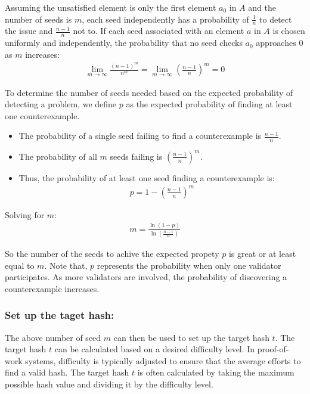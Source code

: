 \documentclass[runningheads]{llncs}
\begin{document}
Assuming the unsatisfied element is only the first element \( a_0 \) in \( A \) and the number of seeds is \( m \), each seed independently has a probability of \( \frac{1}{n} \) to detect the issue and \( \frac{n-1}{n} \) not to. If each seed associated with an element \( a \) in \( A \) is chosen uniformly and independently, the probability that no seed checks \( a_0 \) approaches 0 as \( m \) increases:
\begin{gather*}
\lim_{m \to \infty} \frac{(n-1)^m}{n^m} = \lim_{m \to \infty} \left( \frac{n-1}{n} \right)^m = 0
\end{gather*}

To determine the number of seeds needed based on the expected probability of detecting a problem, we define \( p \) as the expected probability of finding at least one counterexample. 
\begin{itemize}
    \item The probability of a single seed failing to find a counterexample is \( \frac{n-1}{n} \).
    \item The probability of all \( m \) seeds failing is \( \left( \frac{n-1}{n} \right)^m \).
    \item Thus, the probability of at least one seed finding a counterexample is:
\begin{gather*}
  p = 1 - \left( \frac{n-1}{n} \right)^m
\end{gather*}
\end{itemize}
Solving for \( m \):
\begin{gather}
\label{eq:12}
m = \frac{\ln(1 - p)}{\ln\left( \frac{n-1}{n} \right)}
\end{gather}

So the number of the seeds to achive the expected propety $p$ is great or at least equal to $m$. Note that, \( p \) represents the probability when only one validator participates. As more validators are involved, the probability of discovering a counterexample increases.
\subsubsection{Set up the taget hash:}
The above number of seed $m$ can then be used to set up the target hash $t$. The target hash $t$ can be calculated based on a desired difficulty level. In proof-of-work systems, difficulty is typically adjusted to ensure that the average efforts to find a valid hash. The target hash $t$ is often calculated by taking the maximum possible hash value and dividing it by the difficulty level.
\end{document}

